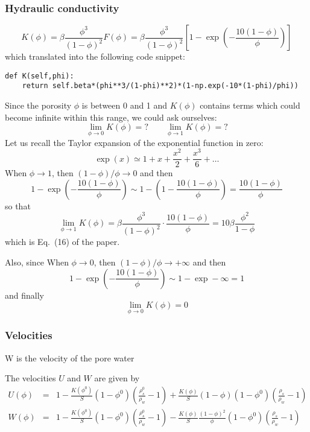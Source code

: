 \documentclass[a4paper]{article}
\begin{document}
\subsubsection*{Hydraulic conductivity}

\[
K(\phi)
=\beta \frac{\phi^3}{(1-\phi)^2} F(\phi)
=\beta \frac{\phi^3}{(1-\phi)^2} \left[ 1-\exp\left( -\frac{10(1-\phi)}{\phi} \right) \right] 
\]
which translated into the following code snippet:
\begin{lstlisting}
def K(self,phi):
    return self.beta*(phi**3/(1-phi)**2)*(1-np.exp(-10*(1-phi)/phi))
\end{lstlisting}

Since the porosity $\phi$ is between 0 and 1 and $K(\phi)$ contains terms which 
could become infinite within this range, we could ask ourselves:
\[
\lim_{\phi\rightarrow 0} K(\phi) = ?
\qquad
\lim_{\phi\rightarrow 1} K(\phi) = ?
\]
Let us recall the Taylor expansion of the exponential function in zero:
\[
\exp (x) \simeq 1 + x + \frac{x^2}{2} + \frac{x^3}{6} + \dots
\]
When $\phi \rightarrow 1$, then $(1-\phi)/\phi \rightarrow 0$ and then 
\[
1-\exp\left( -\frac{10(1-\phi)}{\phi} \right) \sim 1- (1 -\frac{10(1-\phi)}{\phi} ) = \frac{10(1-\phi)}{\phi}
\]
so that 
\[
\lim_{\phi\rightarrow 1} K(\phi) = \beta \frac{\phi^3}{(1-\phi)^2} \cdot \frac{10(1-\phi)}{\phi}
=10 \beta \frac{\phi^2}{1-\phi}
\]
which is Eq.~(16) of the paper.

Also, since When $\phi \rightarrow 0$, then $(1-\phi)/\phi \rightarrow +\infty$ and then
\[
1-\exp\left( -\frac{10(1-\phi)}{\phi} \right) \sim 1 - \exp -\infty = 1 
\]
and finally
\[
\lim_{\phi\rightarrow 0} K(\phi) = 0
\]

\subsubsection*{Velocities}

W is the velocity of the pore water

The velocities $U$ and $W$ are given by 
\begin{eqnarray}
U(\phi)&=& 1-\frac{K(\phi^0)}{S}(1-\phi^0)(\frac{\rho_s^0}{\rho_w}-1) 
+\frac{K(\phi)}{S}(1-\phi) (1-\phi^0)(\frac{\rho_s}{\rho_w}-1)    \\
W(\phi)&=& 1-\frac{K(\phi^0)}{S}(1-\phi^0)(\frac{\rho_s^0}{\rho_w}-1) 
-\frac{K(\phi)}{S} \frac{(1-\phi)^2}{\phi} (1-\phi^0)(\frac{\rho_s}{\rho_w}-1)   
\end{eqnarray}
\end{document}
